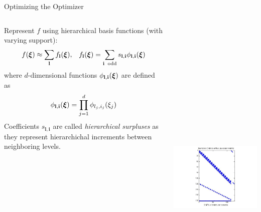 \documentclass[final]{beamer}
\newcommand {\bxi} {\mbox{\boldmath $\xi$}}%
\newcommand{\bl}{\ensuremath{\mathbf{l}}} %
\newcommand{\bi}{\ensuremath{\mathbf{i}}} %
\begin{document}
\begin{frame}{}
{\begin{columns}[t]
\begin{column}{.30\linewidth}
\begin{block}{\centering Optimizing the Optimizer}
\begin{columns}[T]
\begin{column}{22cm}{}
Represent $f$ using hierarchical basis functions (with varying support):\\
\begin{equation*}
f(\bxi) \approx \sum\limits_{\bl} f_{\bl}(\bxi), \;\;\; f_{\bl}(\bxi) = \sum\limits_{\bi\;\;\text{odd}}  s_{\bl,\bi} \phi_{\bl,\bi}(\bxi)
\end{equation*}
\noindent
where $d$-dimensional functions $\phi_{\bl,\bi}(\bxi)$ are defined as
\begin{equation*}
\phi_{\bl,\bi}(\bxi) = \prod_{j=1}^d \phi_{l_j,i_j}(\xi_j)
\end{equation*}
Coefficients $s_{\bl,\bi}$ are called \textit{hierarchical surpluses} as they represent hierarchichal increments between neighboring levels.
\end{column}
\begin{column}{12cm}{}
\centering\includegraphics[height=16cm, width = 10cm]{figures/Spy_Jacobian.jpg} \\

\end{column}
\end{columns}
\end{block}
\end{column}
\end{columns}}
\end{frame}
\end{document}
